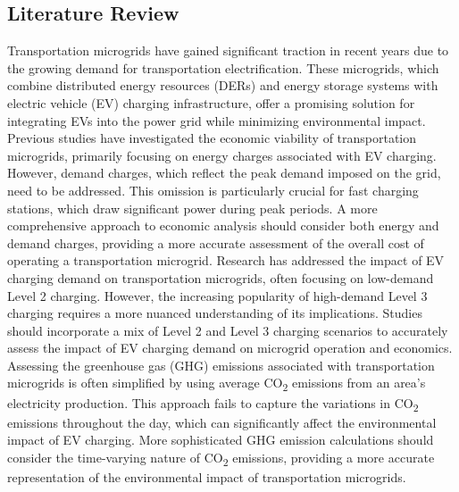 \documentclass[conference]{IEEEtran}
\begin{document}
  	\subsection{Literature Review}
  		Transportation microgrids have gained significant traction in recent years due to the growing demand for transportation electrification. These microgrids, which combine distributed energy resources (DERs) and energy storage systems with electric vehicle (EV) charging infrastructure, offer a promising solution for integrating EVs into the power grid while minimizing environmental impact. Previous studies have investigated the economic viability of transportation microgrids, primarily focusing on energy charges associated with EV charging. However, demand charges, which reflect the peak demand imposed on the grid, need to be addressed. This omission is particularly crucial for fast charging stations, which draw significant power during peak periods. A more comprehensive approach to economic analysis should consider both energy and demand charges, providing a more accurate assessment of the overall cost of operating a transportation microgrid. Research has addressed the impact of EV charging demand on transportation microgrids, often focusing on low-demand Level 2 charging. However, the increasing popularity of high-demand Level 3 charging requires a more nuanced understanding of its implications. Studies should incorporate a mix of Level 2 and Level 3 charging scenarios to accurately assess the impact of EV charging demand on microgrid operation and economics. Assessing the greenhouse gas (GHG) emissions associated with transportation microgrids is often simplified by using average CO\textsubscript{2} emissions from an area's electricity production. This approach fails to capture the variations in CO\textsubscript{2} emissions throughout the day, which can significantly affect the environmental impact of EV charging. More sophisticated GHG emission calculations should consider the time-varying nature of CO\textsubscript{2} emissions, providing a more accurate representation of the environmental impact of transportation microgrids. 
  		
\end{document}
